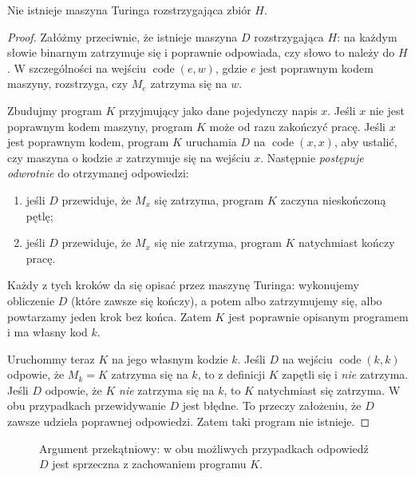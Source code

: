 \begin{twierdzenie}\label{thm:computability-halting-undecidable}
Nie istnieje maszyna Turinga rozstrzygająca zbiór $H$.
\end{twierdzenie}
\begin{proof}
Załóżmy przeciwnie, że istnieje maszyna $D$ rozstrzygająca
$H$: na każdym słowie binarnym zatrzymuje się i poprawnie
odpowiada, czy słowo to należy do $H$.
W szczególności na wejściu $\operatorname{code}(e,w)$,
gdzie $e$ jest poprawnym kodem maszyny, rozstrzyga,
czy $M_e$ zatrzyma się na $w$.

Zbudujmy program $K$ przyjmujący jako dane pojedynczy
napis $x$. Jeśli $x$ nie jest poprawnym kodem maszyny,
program $K$ może od razu zakończyć pracę.
Jeśli $x$ jest poprawnym kodem, program $K$ uruchamia
$D$ na $\operatorname{code}(x,x)$, aby ustalić,
czy maszyna o kodzie $x$ zatrzymuje się na wejściu $x$.
Następnie \emph{postępuje odwrotnie} do otrzymanej odpowiedzi:
\begin{enumerate}[label=(\roman*)]
\item jeśli $D$ przewiduje, że $M_x$ się zatrzyma,
      program $K$ zaczyna nieskończoną pętlę;
\item jeśli $D$ przewiduje, że $M_x$ się nie zatrzyma,
      program $K$ natychmiast kończy pracę.
\end{enumerate}
Każdy z tych kroków da się opisać przez maszynę Turinga:
wykonujemy obliczenie $D$ (które zawsze się kończy),
a potem albo zatrzymujemy się, albo powtarzamy jeden krok bez końca.
Zatem $K$ jest poprawnie opisanym programem i ma własny kod $k$.

Uruchommy teraz $K$ na jego własnym kodzie $k$.
Jeśli $D$ na wejściu $\operatorname{code}(k,k)$ odpowie,
że $M_k=K$ zatrzyma się na $k$, to z definicji
$K$ zapętli się i \emph{nie} zatrzyma.
Jeśli $D$ odpowie, że $K$ \emph{nie} zatrzyma się na $k$,
to $K$ natychmiast się zatrzyma.
W obu przypadkach przewidywanie $D$ jest błędne.
To przeczy założeniu, że $D$ zawsze udziela poprawnej odpowiedzi.
Zatem taki program nie istnieje.
\end{proof}

\begin{figure}[htbp]
\centering
{}
\caption{Argument przekątniowy: w obu możliwych przypadkach
  odpowiedź $D$ jest sprzeczna z zachowaniem programu $K$.}
\label{fig:computability-diagonal}
\end{figure}

